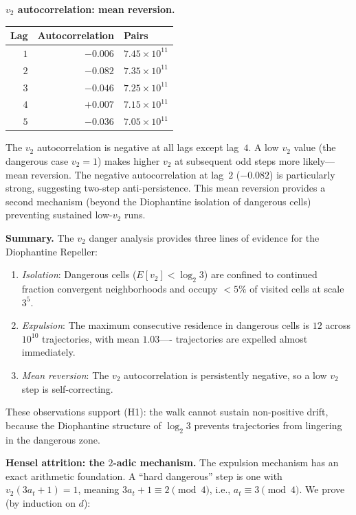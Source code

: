 \documentclass[manuscript]{aomart}
\theoremstyle{plain}
\theoremstyle{definition}
\theoremstyle{remark}
\numberwithin{equation}{section}
\begin{document}
\medskip\noindent
\textbf{$v_2$ autocorrelation: mean reversion.}

\begin{center}
\renewcommand{\arraystretch}{1.3}
\begin{tabular}{rrl}
  \toprule
  \textbf{Lag} & \textbf{Autocorrelation} & \textbf{Pairs} \\
  \midrule
  $1$ & $-0.006$ & $7.45 \times 10^{11}$ \\
  $2$ & $-0.082$ & $7.35 \times 10^{11}$ \\
  $3$ & $-0.046$ & $7.25 \times 10^{11}$ \\
  $4$ & $+0.007$ & $7.15 \times 10^{11}$ \\
  $5$ & $-0.036$ & $7.05 \times 10^{11}$ \\
  \bottomrule
\end{tabular}
\end{center}

The $v_2$ autocorrelation is negative at all lags except lag~$4$.
A low $v_2$ value (the dangerous case $v_2 = 1$) makes higher $v_2$
at subsequent odd steps more likely---mean reversion.  The negative
autocorrelation at lag~$2$ ($-0.082$) is particularly strong,
suggesting two-step anti-persistence.  This mean reversion provides a
second mechanism (beyond the Diophantine isolation of dangerous cells)
preventing sustained low-$v_2$ runs.

\medskip\noindent
\textbf{Summary.}\enspace
The $v_2$ danger analysis provides three lines of evidence for the
Diophantine Repeller:
\begin{enumerate}
\item \emph{Isolation}: Dangerous cells ($E[v_2] < \log_2 3$) are
  confined to continued fraction convergent neighborhoods and occupy
  $< 5\%$ of visited cells at scale $3^5$.
\item \emph{Expulsion}: The maximum consecutive residence in dangerous
  cells is $12$ across $10^{10}$ trajectories, with mean $1.03$----%
  trajectories are expelled almost immediately.
\item \emph{Mean reversion}: The $v_2$ autocorrelation is persistently
  negative, so a low $v_2$ step is self-correcting.
\end{enumerate}
These observations support (H1): the walk cannot sustain non-positive
drift, because the Diophantine structure of $\log_2 3$ prevents
trajectories from lingering in the dangerous zone.

\medskip\noindent
\textbf{Hensel attrition: the $2$-adic mechanism.}\enspace
The expulsion mechanism has an exact arithmetic foundation.
A ``hard dangerous'' step is one with $v_2(3a_t+1) = 1$, meaning
$3a_t + 1 \equiv 2 \pmod{4}$, i.e., $a_t \equiv 3 \pmod{4}$.
We prove (by induction on $d$):
\end{document}
